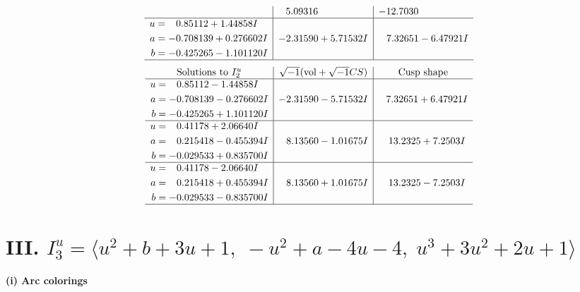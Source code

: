 \documentclass[1p]{elsarticle_modified}
\theoremstyle{definition}
\newcommand{\I}{\sqrt{-1}}
\begin{document}
$$\begin{array}{c|c|c}
 & \phantom{-}5.09316\phantom{ +0.000000I} & -12.7030\phantom{ +0.000000I} \\ \hline\begin{aligned}
u &= \phantom{-}0.85112 + 1.44858 I \\
a &= -0.708139 + 0.276602 I \\
b &= -0.425265 - 1.101120 I\end{aligned}
 & -2.31590 + 5.71532 I & \phantom{-}7.32651 - 6.47921 I\\
 \hline 
 \end{array}$$\newpage$$\begin{array}{c|c|c}  
\text{Solutions to }I^u_{2}& \I (\text{vol} + \sqrt{-1}CS) & \text{Cusp shape}\\
 \hline 
\begin{aligned}
u &= \phantom{-}0.85112 - 1.44858 I \\
a &= -0.708139 - 0.276602 I \\
b &= -0.425265 + 1.101120 I\end{aligned}
 & -2.31590 - 5.71532 I & \phantom{-}7.32651 + 6.47921 I \\ \hline\begin{aligned}
u &= \phantom{-}0.41178 + 2.06640 I \\
a &= \phantom{-}0.215418 - 0.455394 I \\
b &= -0.029533 + 0.835700 I\end{aligned}
 & \phantom{-}8.13560 - 1.01675 I & \phantom{-}13.2325 + 7.2503 I \\ \hline\begin{aligned}
u &= \phantom{-}0.41178 - 2.06640 I \\
a &= \phantom{-}0.215418 + 0.455394 I \\
b &= -0.029533 - 0.835700 I\end{aligned}
 & \phantom{-}8.13560 + 1.01675 I & \phantom{-}13.2325 - 7.2503 I\\
 \hline 
 \end{array}$$\newpage\newpage\renewcommand{\arraystretch}{1}
\centering \section*{III. $I^u_{3}= \langle u^2+b+3 u+1,\;- u^2+a-4 u-4,\;u^3+3 u^2+2 u+1 \rangle$}
\flushleft \textbf{(i) Arc colorings}\\
\end{document}
